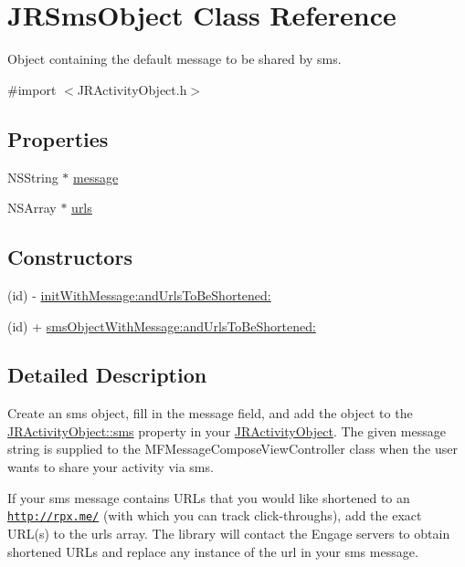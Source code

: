 \hypertarget{interface_j_r_sms_object}{
\section{JRSmsObject Class Reference}
\label{interface_j_r_sms_object}
}


Object containing the default message to be shared by sms.  




{\ttfamily \#import $<$JRActivityObject.h$>$}

\subsection*{Properties}
\begin{DoxyCompactItemize}
\item 
NSString $\ast$ \hyperlink{interface_j_r_sms_object_a6d74c049eba0e6ecfae0e25cffd77d6e}{message}
\item 
NSArray $\ast$ \hyperlink{interface_j_r_sms_object_a181c9385d2dc5ade8b096e2302a47a50}{urls}
\end{DoxyCompactItemize}
\subsection*{Constructors}
\label{_amgrp559a25fdb98a7d1fd1c3771ac568d5e9}
 \begin{DoxyCompactItemize}
\item 
(id) -\/ \hyperlink{interface_j_r_sms_object_a7669f3987b203f6235c5d6e9b0b81535}{initWithMessage:andUrlsToBeShortened:}
\item 
(id) + \hyperlink{interface_j_r_sms_object_a7405d41cfdc3add99e5f8c8c8d1f9c10}{smsObjectWithMessage:andUrlsToBeShortened:}
\end{DoxyCompactItemize}


\subsection{Detailed Description}
Create an sms object, fill in the message field, and add the object to the \hyperlink{interface_j_r_activity_object_a7719b59135bd02dbd03d4b35b17cb0a0}{JRActivityObject::sms} property in your \hyperlink{interface_j_r_activity_object}{JRActivityObject}. The given message string is supplied to the MFMessageComposeViewController class when the user wants to share your activity via sms.

If your sms message contains URLs that you would like shortened to an \href{http://rpxnow.com/docs/iphone#shorten_urls}{\tt http://rpx.me/} (with which you can track click-\/throughs), add the exact URL(s) to the {\ttfamily urls} array. The library will contact the Engage servers to obtain shortened URLs and replace any instance of the url in your sms message.

